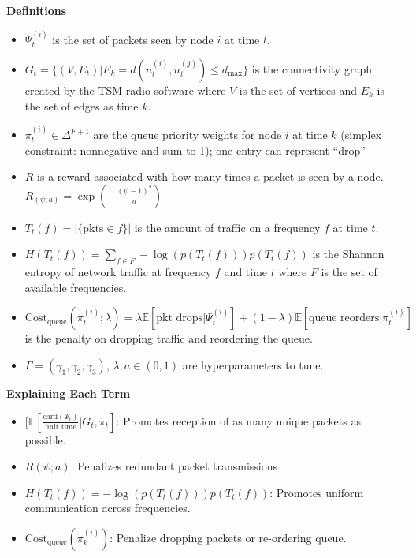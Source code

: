 \documentclass{article}
\begin{document}
\textbf{Definitions}
\begin{itemize}
    \item $\Psi_{t}^{(i)}$ is the set of packets seen by node $i$ at time $t$.
    \item $G_{t} = \{ (V, E_{t}) | E_{k} = d(n_{t}^{(i)}, n_{t}^{(j)}) \le d_{\text{max}} \}$ is the connectivity graph created by the TSM radio software where $V$ is the set of vertices and $E_{k}$ is the set of edges as time $k$.
    \item $\pi_{t}^{(i)}\in\Delta^{F+1}$ are the queue priority weights for node $i$ at time $k$ (simplex constraint: nonnegative and sum to 1); one entry can represent ``drop''
    \item $R$ is a reward associated with how many times a packet is seen by a node. $R_(\psi; a) = \exp(- \frac{(\psi - 1)^{2}}{a})$
    \item $T_{t}(f) = | \{ \text{pkts} \in f\} |$ is the amount of traffic on a frequency $f$ at time $t$.
    \item $H(T_{t}(f))= \sum _{f \in F} -\log(p(T_{t}(f))) p(T_{t}(f))$ is the Shannon entropy of network traffic at frequency $f$ and time $t$ where $F$ is the set of available frequencies.
    \item $\text{Cost}_{\text{queue}}(\pi_{t}^{(i)}; \lambda) = \lambda \mathbb{E}[\text{pkt drops}| \Psi_{t}^{(i)}] + (1 - \lambda) \mathbb{E}[\text{queue reorders}| \pi_{t}^{(i)}]$ is the penalty on dropping traffic and reordering the queue.
    \item $\Gamma = (\gamma_{1}, \gamma_{2}, \gamma_{3})$, $\lambda, a \in (0, 1)$ are hyperparameters to tune.
\end{itemize}


\vspace{1 cm}

\textbf{Explaining Each Term}
\begin{itemize}
    \item $ [ \mathbb{E}[\frac{\text{card}(\Psi_{t})}{\text{unit time}} | G_{t}, \pi_{t}]$: Promotes reception of as many unique packets as possible.
    \item $R(\psi; a)$: Penalizes redundant packet transmissions
    \item $H(T_{t}(f))= -\log(p(T_{t}(f))) p(T_{t}(f))$: Promotes uniform communication across frequencies.
    \item $\text{Cost}_{\text{queue}}(\pi_{k}^{(i)})$: Penalize dropping packets or re-ordering queue.
\end{itemize}
\end{document}
